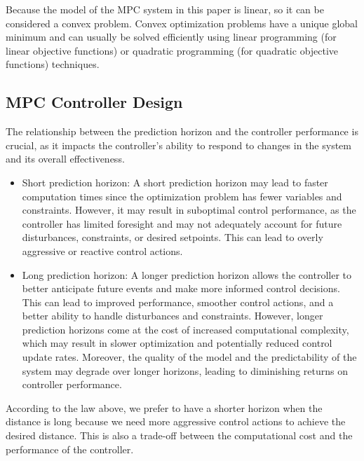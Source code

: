 \documentclass{article}
\numberwithin{equation}{section}
\begin{document}
Because the model of the MPC system in this paper is linear, so it can be
considered a convex problem\cite{LIMON20082382}. Convex optimization problems
have a unique global minimum and can usually be solved efficiently using linear
programming (for linear objective functions) or quadratic programming (for
quadratic objective functions) techniques.


\subsection{MPC Controller Design}

The relationship between the prediction horizon and the controller performance
is crucial, as it impacts the controller's ability to respond to changes in the
system and its overall effectiveness.
\begin{itemize}
    \item Short prediction horizon: A short prediction horizon may lead to faster
          computation times since the optimization problem has fewer variables and
          constraints. However, it may result in suboptimal control performance, as the
          controller has limited foresight and may not adequately account for future
          disturbances, constraints, or desired setpoints. This can lead to overly
          aggressive or reactive control actions.

    \item Long prediction horizon: A longer prediction horizon allows the controller to
          better anticipate future events and make more informed control decisions. This
          can lead to improved performance, smoother control actions, and a better
          ability to handle disturbances and constraints. However, longer prediction
          horizons come at the cost of increased computational complexity, which may
          result in slower optimization and potentially reduced control update rates.
          Moreover, the quality of the model and the predictability of the system may
          degrade over longer horizons, leading to diminishing returns on controller
          performance.
\end{itemize}

According to the law above, we prefer to have a shorter horizon when the
distance is long because we need more aggressive control actions to achieve the
desired distance. This is also a trade-off between the computational cost and
the performance of the controller.
\end{document}
